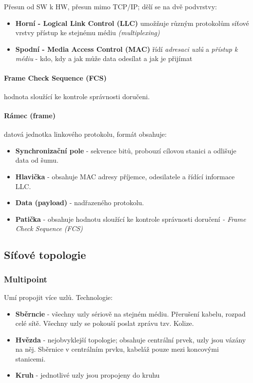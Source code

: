 \documentclass[10pt,a4paper]{article}
\begin{document}
Přesun od SW k HW, přesun mimo TCP/IP; dělí se na dvě podvrstvy:
\begin{itemize}
    \item \textbf{Horní - Logical Link Control (LLC)} umožňuje různým protokolům síťové vrstvy přístup ke stejnému médiu \textit{(multiplexing)}
    \item \textbf{Spodní - Media Access Control (MAC)} řídí \textit{adresaci uzlů} a \textit{přístup k médiu} - kdo, kdy a jak může data odesílat a jak je přijímat    
\end{itemize}

\paragraph*{Frame Check Sequence (FCS)} hodnota sloužící ke kontrole správnosti doručeni.

\paragraph*{Rámec (frame)} datová jednotka linkového protokolu, formát obsahuje:
\begin{itemize}
    \item \textbf{Synchronizační pole} - sekvence bitů, probouzí cílovou stanici a odlišuje data od šumu.
    \item \textbf{Hlavička} - obsahuje MAC adresy příjemce, odesilatele a řídící informace LLC.
    \item \textbf{Data (payload) } - nadřazeného protokolu.
    \item \textbf{Patička} - obsahuje hodnotu sloužící ke kontrole správnosti doručení \textit{- Frame Check Sequence (FCS)}
\end{itemize}


\subsection{Síťové topologie}

\subsubsection{Multipoint}

Umí propojit více uzlů. Technologie:

\begin{itemize}
    \item \textbf{Sběrncie} - všechny uzly sériově na stejném médiu. Přerušení kabelu, rozpad celé sítě. Všechny uzly se pokouší poslat zprávu tzv. Kolize.
    \item \textbf{Hvězda} - nejobvyklejší topologie; obsahuje centrální prvek, uzly jsou vázány na něj. Sběrnice v centrálním prvku, kabeláž pouze mezi koncovými stanicemi.
    \item \textbf{Kruh} - jednotlivé uzly jsou propojeny do kruhu
\end{itemize}
\end{document}
